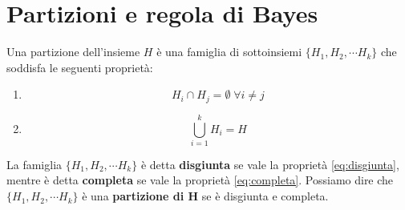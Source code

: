 \documentclass[../main.tex]{subfiles}
\begin{document}
\section{Partizioni e regola di Bayes}
\begin{definition}
    Una partizione dell'insieme $H$ è una famiglia di sottoinsiemi $\{ H_{1},H_{2},\cdots H_{k}\}$ che soddisfa le seguenti proprietà:
    \begin{enumerate}
        \item \begin{equation}
            \label{eq:disgiunta}
             H_{i}\cap H_{j}=\emptyset \; \forall  i\neq j
        \end{equation}
        \item \begin{equation}
            \label{eq:completa}
            \bigcup_{i=1}^{k}H_{i}=H
        \end{equation}
    \end{enumerate}
\end{definition}
\hfill \break
La famiglia $\{ H_{1},H_{2},\cdots H_{k}\}$ è detta \textbf{disgiunta} se vale la proprietà \ref{eq:disgiunta}, mentre è detta \textbf{completa} se vale la proprietà \ref{eq:completa}.
Possiamo dire che $\{ H_{1},H_{2},\cdots H_{k}\}$ è una \textbf{partizione di H} se è disgiunta e completa. 

\begin{comment}
\section{Richiami di statistica}

Sia $\{ H_{1},H_{2},\cdots H_{k}\}$ un partizione di $H$,$P(H)=1$ e sia $E$ un evento specifico. Allora gli assiomi di probabilità ci dicono che:
\begin{itemize}
    \item \begin{equation}\label{eq:prob tot}
        \sum_{i=1}^{k}P(H_{i})=1.
    \end{equation}
    \item \begin{equation}\label{eq:prob marg}
        P(E)=\sum_{i=1}^{k}P(E\cap H_{i})=\sum_{i=1}^{k}P(E|H_{i})P(H_{i}).
    \end{equation}
\end{itemize}
Dove \ref{eq:prob tot} è detta \textbf{Regola di probabilità totale} e \ref{eq:prob marg} è detta \textbf{Regola di probabilità marginale}.
\begin{definition}[Formula di Bayes]
\begin{equation}
    P(H_{j}|E)=\frac{P(E|H_{j})P(H_{j})}{P(E)}\stackrel{\ref{eq:prob marg}}{=}\frac{P(E|H_{j})P(H_{j})}{\sum_{i=1}^{k}P(E|H_{i})P(H_{i})}.
\end{equation}
\end{definition}
\end{comment}
\end{document}
